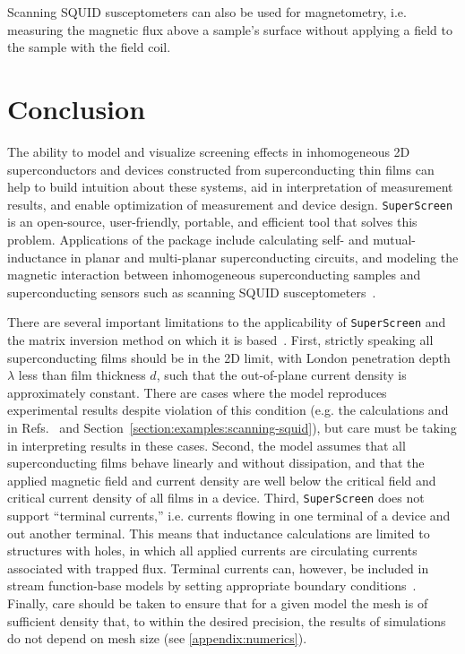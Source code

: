 \documentclass[final,3p,times,twocolumn]{elsarticle}
\newcommand{\inline}[1]{\texttt{#1}\xspace}
\newcommand{\SuperScreen}{\inline{SuperScreen}}
\begin{document}
Scanning SQUID susceptometers can also be used for magnetometry, i.e. measuring the magnetic flux above a sample's surface without applying a field to the sample with the field coil.

\section{Conclusion}
\label{section:conlusion}

The ability to model and visualize screening effects in inhomogeneous 2D superconductors and devices constructed from superconducting thin films can help to build intuition about these systems, aid in interpretation of measurement results, and enable optimization of measurement and device design. \SuperScreen is an open-source, user-friendly, portable, and efficient tool that solves this problem. Applications of the package include calculating self- and mutual-inductance in planar and multi-planar superconducting circuits, and modeling the magnetic interaction between inhomogeneous superconducting samples and superconducting sensors such as scanning SQUID susceptometers~\cite{Kirtley2016-zz}.

There are several important limitations to the applicability of \SuperScreen and the matrix inversion method on which it is based~\cite{Brandt2004-ew,Brandt2005-wj}. First, strictly speaking all superconducting films should be in the 2D limit, with London penetration depth $\lambda$ less than film thickness $d$, such that the out-of-plane current density is approximately constant. There are cases where the model reproduces experimental results despite violation of this condition (e.g. the calculations and in Refs.~\cite{Kirtley2016-zz,Kirtley2016-gt} and Section~\ref{section:examples:scanning-squid}), but care must be taking in interpreting results in these cases. Second, the model assumes that all superconducting films behave linearly and without dissipation, and that the applied magnetic field and current density are well below the critical field and critical current density of all films in a device. Third, \SuperScreen does not support ``terminal currents,'' i.e. currents flowing in one terminal of a device and out another terminal. This means that inductance calculations are limited to structures with holes, in which all applied currents are circulating currents associated with trapped flux. Terminal currents can, however, be included in stream function-base models by setting appropriate boundary conditions~\cite{Khapaev1997-kw,Khapaev2001-xq,Khapaev2001-pw,Muller2021-ci}. Finally, care should be taken to ensure that for a given model the mesh is of sufficient density that, to within the desired precision, the results of simulations do not depend on mesh size (see \ref{appendix:numerics}).
\end{document}

